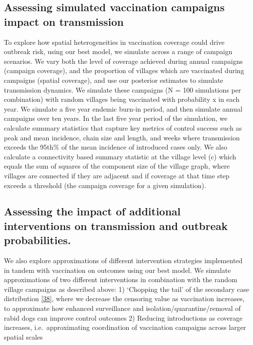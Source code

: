 \documentclass[
  oneside]{book}
\begin{document}
\hypertarget{assessing-simulated-vaccination-campaigns-impact-on-transmission}{%
\subsection{Assessing simulated vaccination campaigns impact on transmission}\label{assessing-simulated-vaccination-campaigns-impact-on-transmission}}

To explore how spatial heterogeneities in vaccination coverage could drive outbreak risk, using our best model, we simulate across a range of campaign scenarios. We vary both the level of coverage achieved during annual campaigns (campaign coverage), and the proportion of villages which are vaccinated during campaigns (spatial coverage), and use our posterior estimates to simulate transmission dynamics. We simulate these campaigns (N = 100 simulations per combination) with random villages being vaccinated with probability x in each year. We simulate a five year endemic burn-in period, and then simulate annual campaigns over ten years. In the last five year period of the simulation, we calculate summary statistics that capture key metrics of control success such as peak and mean incidence, chain size and length, and weeks where transmission exceeds the 95th\% of the mean incidence of introduced cases only. We also calculate a connectivity based summary statistic at the village level (c) which equals the sum of squares of the component size of the village graph, where villages are connected if they are adjacent and if coverage at that time step exceeds a threshold (the campaign coverage for a given simulation).

\hypertarget{assessing-the-impact-of-additional-interventions-on-transmission-and-outbreak-probabilities.}{%
\subsection{Assessing the impact of additional interventions on transmission and outbreak probabilities.}\label{assessing-the-impact-of-additional-interventions-on-transmission-and-outbreak-probabilities.}}

We also explore approximations of different intervention strategies implemented in tandem with vaccination on outcomes using our best model. We simulate approximations of two different interventions in combination with the random village campaigns as described above:
1) `Chopping the tail' of the secondary case distribution \protect\hyperlink{ref-Kain2020}{{[}38{]}}, where we decrease the censoring value as vaccination increases, to approximate how enhanced surveillance and isolation/quarantine/removal of rabid dogs can improve control outcomes
2) Reducing introductions as coverage increases, i.e.~approximating coordination of vaccination campaigns across larger spatial scales
\end{document}
